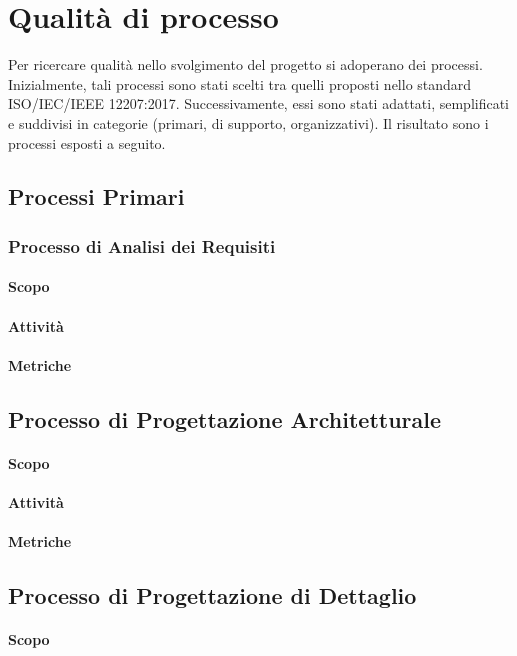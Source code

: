 \section{Qualità di processo}
Per ricercare qualità nello svolgimento del progetto si adoperano dei processi. Inizialmente, tali processi sono stati scelti tra quelli proposti nello standard ISO/IEC/IEEE 12207:2017. Successivamente, essi sono stati adattati, semplificati e suddivisi in categorie (primari, di supporto, organizzativi).\newline 
Il risultato sono i processi esposti a seguito. 

\subsection{Processi Primari}
	\subsubsection{Processo di Analisi dei Requisiti}
		\paragraph{Scopo}
		\paragraph{Attività}
		\paragraph{Metriche}
	\subsection{Processo di Progettazione Architetturale}
		\paragraph{Scopo}
		\paragraph{Attività}
		\paragraph{Metriche}
	\subsection{Processo di Progettazione di Dettaglio}
		\paragraph{Scopo}
